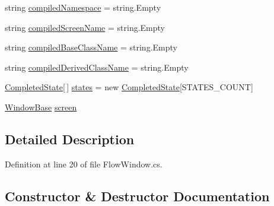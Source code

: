 \begin{DoxyCompactItemize}
\item 
string \hyperlink{class_unity_engine_1_1_u_i_1_1_windows_1_1_plugins_1_1_flow_1_1_flow_window_a4918dc936327ad14766ad86e7624458e}{compiled\+Namespace} = string.\+Empty
\item 
string \hyperlink{class_unity_engine_1_1_u_i_1_1_windows_1_1_plugins_1_1_flow_1_1_flow_window_a7d2bd8570043cd235523c7083393f20c}{compiled\+Screen\+Name} = string.\+Empty
\item 
string \hyperlink{class_unity_engine_1_1_u_i_1_1_windows_1_1_plugins_1_1_flow_1_1_flow_window_af194ba46d6c3b833bc2f2352ce3c6ff6}{compiled\+Base\+Class\+Name} = string.\+Empty
\item 
string \hyperlink{class_unity_engine_1_1_u_i_1_1_windows_1_1_plugins_1_1_flow_1_1_flow_window_ab7971f5e2c03511723ac6fc9c2763aa8}{compiled\+Derived\+Class\+Name} = string.\+Empty
\item 
\hyperlink{namespace_unity_engine_1_1_u_i_1_1_windows_1_1_plugins_1_1_flow_a4525a1ea5727aeeef99ada173b0bd2b2}{Completed\+State}\mbox{[}$\,$\mbox{]} \hyperlink{class_unity_engine_1_1_u_i_1_1_windows_1_1_plugins_1_1_flow_1_1_flow_window_a704561c1b31a3ed58230649c449cd6d1}{states} = new \hyperlink{namespace_unity_engine_1_1_u_i_1_1_windows_1_1_plugins_1_1_flow_a4525a1ea5727aeeef99ada173b0bd2b2}{Completed\+State}\mbox{[}S\+T\+A\+T\+E\+S\+\_\+\+C\+O\+U\+N\+T\mbox{]}
\item 
\hyperlink{class_unity_engine_1_1_u_i_1_1_windows_1_1_window_base}{Window\+Base} \hyperlink{class_unity_engine_1_1_u_i_1_1_windows_1_1_plugins_1_1_flow_1_1_flow_window_a112a7288a0d2ab66cf632937c34684ff}{screen}
\end{DoxyCompactItemize}


\subsection{Detailed Description}


Definition at line 20 of file Flow\+Window.\+cs.



\subsection{Constructor \& Destructor Documentation}
\hypertarget{class_unity_engine_1_1_u_i_1_1_windows_1_1_plugins_1_1_flow_1_1_flow_window_ac4bfe7477e76f2ab63e3ca91f3f6f565}{}
